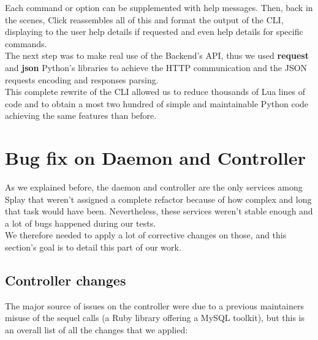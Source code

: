 \documentclass{eplmastersthesis}
\begin{document}
        Each command or option can be supplemented with help messages. Then,
        back in the scenes, Click reassembles all of this and format the
        output of the CLI, displaying to the user help details if requested
        and even help details for specific commands.\\

        The next step was to make real use of the Backend's API, thus we used
        \textbf{request} \cite{request} and \textbf{json} Python's libraries to
        achieve the HTTP communication and the JSON requests encoding and
        responses parsing.\\

        This complete rewrite of the CLI allowed us to reduce thousands of
        Lua lines of code and to obtain a most two hundred of simple and
        maintainable Python code achieving the same features than before.

    \section{Bug fix on Daemon and Controller}

      As we explained before, the daemon and controller are the only services
      among Splay that weren't assigned a complete refactor because of how
      complex and long that task would have been. Nevertheless, these services
      weren't stable enough and a lot of bugs happened during our tests.\\
      We therefore needed to apply a lot of corrective changes on those, and
      this section's goal is to detail this part of our work.

      \subsection{Controller changes}

        The major source of issues on the controller were due to a previous
        maintainers misuse of the sequel calls (a Ruby library offering a MySQL
        toolkit), but this is an overall list of all the changes that we
        applied:
\end{document}
